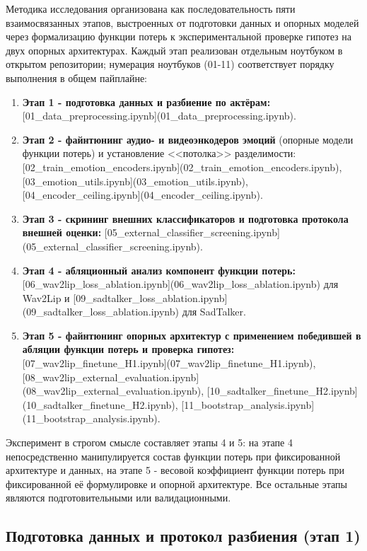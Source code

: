 \documentclass[a4paper, 12pt, oneside, openany]{article}
\begin{document}
Методика исследования организована как последовательность пяти взаимосвязанных этапов, выстроенных от подготовки данных и опорных моделей через формализацию функции потерь к экспериментальной проверке гипотез на двух опорных архитектурах. Каждый этап реализован отдельным ноутбуком в открытом репозитории; нумерация ноутбуков (01-11) соответствует порядку выполнения в общем пайплайне:
\begin{enumerate}
\item \textbf{Этап 1 - подготовка данных и разбиение по актёрам:} [01\_data\_preprocessing.ipynb](01\_data\_preprocessing.ipynb).
\item \textbf{Этап 2 - файнтюнинг аудио- и видеоэнкодеров эмоций} (опорные модели функции потерь) и установление <<потолка>> разделимости: [02\_train\_emotion\_encoders.ipynb](02\_train\_emotion\_encoders.ipynb), [03\_emotion\_utils.ipynb](03\_emotion\_utils.ipynb), [04\_encoder\_ceiling.ipynb](04\_encoder\_ceiling.ipynb).
\item \textbf{Этап 3 - скрининг внешних классификаторов и подготовка протокола внешней оценки:} [05\_external\_classifier\_screening.ipynb](05\_external\_classifier\_screening.ipynb).
\item \textbf{Этап 4 - абляционный анализ компонент функции потерь:} [06\_wav2lip\_loss\_ablation.ipynb](06\_wav2lip\_loss\_ablation.ipynb) для Wav2Lip и [09\_sadtalker\_loss\_ablation.ipynb](09\_sadtalker\_loss\_ablation.ipynb) для SadTalker.
\item \textbf{Этап 5 - файнтюнинг опорных архитектур с применением победившей в абляции функции потерь и проверка гипотез:} [07\_wav2lip\_finetune\_H1.ipynb](07\_wav2lip\_finetune\_H1.ipynb), [08\_wav2lip\_external\_evaluation.ipynb](08\_wav2lip\_external\_evaluation.ipynb), [10\_sadtalker\_finetune\_H2.ipynb](10\_sadtalker\_finetune\_H2.ipynb), [11\_bootstrap\_analysis.ipynb](11\_bootstrap\_analysis.ipynb).
\end{enumerate}

Эксперимент в строгом смысле составляет этапы 4 и 5: на этапе 4 непосредственно манипулируется состав функции потерь при фиксированной архитектуре и данных, на этапе 5 - весовой коэффициент функции потерь при фиксированной её формулировке и опорной архитектуре. Все остальные этапы являются подготовительными или валидационными.

\subsection{Подготовка данных и протокол разбиения (этап 1)}
\end{document}
